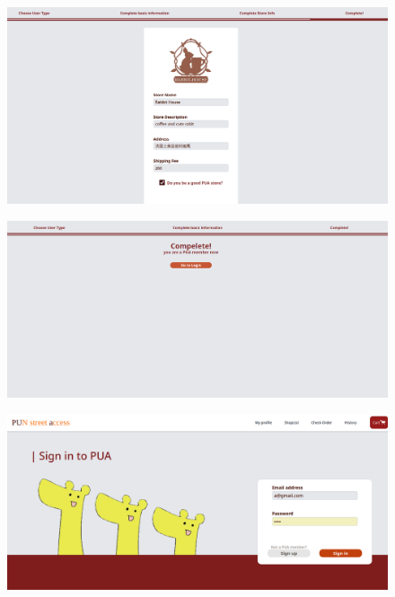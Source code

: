\documentclass[a4paper, 12pt]{article}
\begin{document}
\begin{figure}[hp]
    \centerline{\includegraphics[width=40em]{gui-snapshot/user/register-seller.png}}
    \label{fig:enter-label}
\end{figure}
\begin{figure}[hp]
    \centerline{\includegraphics[width=40em]{gui-snapshot/user/register-customer-3.png}}
    \label{fig:enter-label}
\end{figure}
\newpage
{}
\begin{figure}[hp]
    \centerline{\includegraphics[width=40em]{gui-snapshot/user/login-page.png}}
    \label{fig:enter-label}
\end{figure}
\newpage
\end{document}
